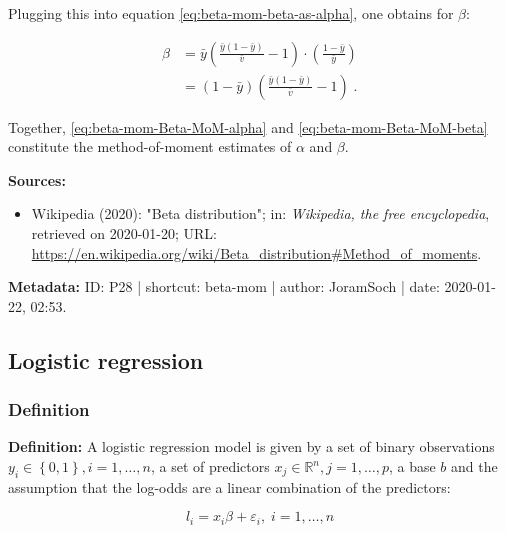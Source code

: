 \documentclass[a4paper,12pt,twoside]{book}
\begin{document}
Plugging this into equation \eqref{eq:beta-mom-beta-as-alpha}, one obtains for $\beta$:

\begin{equation} \label{eq:beta-mom-Beta-MoM-beta}
\begin{split}
\beta &= \bar{y} \left( \frac{\bar{y} (1-\bar{y})}{\bar{v}} - 1 \right) \cdot \left( \frac{1-\bar{y}}{\bar{y}} \right) \\
&= (1-\bar{y}) \left( \frac{\bar{y} (1-\bar{y})}{\bar{v}} - 1 \right) \; .
\end{split}
\end{equation}

Together, \eqref{eq:beta-mom-Beta-MoM-alpha} and \eqref{eq:beta-mom-Beta-MoM-beta} constitute the method-of-moment estimates of $\alpha$ and $\beta$.


\vspace{1em}
\textbf{Sources:}
\begin{itemize}
\item Wikipedia (2020): "Beta distribution"; in: \textit{Wikipedia, the free encyclopedia}, retrieved on 2020-01-20; URL: \url{https://en.wikipedia.org/wiki/Beta_distribution#Method_of_moments}.
\end{itemize}


\vspace{1em}
\textbf{Metadata:} ID: P28 | shortcut: beta-mom | author: JoramSoch | date: 2020-01-22, 02:53.
\vspace{1em}



\subsection{Logistic regression}

\subsubsection[\textit{Definition}]{Definition} \label{sec:logreg}
\setcounter{equation}{0}

\textbf{Definition:} A logistic regression model is given by a set of binary observations $y_i \in \left\lbrace 0, 1 \right\rbrace, i = 1,\ldots,n$, a set of predictors $x_j \in \mathbb{R}^n, j = 1,\ldots,p$, a base $b$ and the assumption that the log-odds are a linear combination of the predictors:

\begin{equation} \label{eq:logreg-logreg}
l_i = x_i \beta + \varepsilon_i, \; i = 1,\ldots,n
\end{equation}
\end{document}
